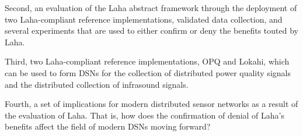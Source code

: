 Second, an evaluation of the Laha abstract framework through the deployment of two Laha-compliant reference implementations, validated data collection, and several experiments that are used to either confirm or deny the benefits touted by Laha. 

Third, two Laha-compliant reference implementations, OPQ and Lokahi, which can be used to form DSNs for the collection of distributed power quality signals and the distributed collection of infrasound signals.

Fourth, a set of implications for modern distributed sensor networks as a result of the evaluation of Laha. That is, how does the confirmation of denial of Laha's benefits affect the field of modern DSNs moving forward?





